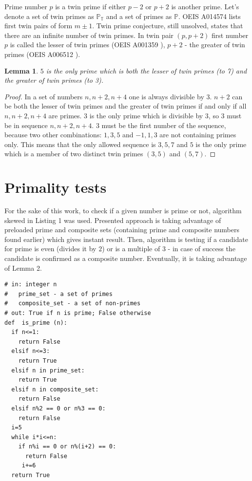 \documentclass[10pt,twocolumn]{article}
\newtheorem{lemma}[theorem]{Lemma}
\begin{document}
Prime number $p$ is a twin prime if either $p-2$ or $p+2$ is another prime. Let's denote a set of twin primes as $\mathbb{P_T}$ and a set of primes as $\mathbb{P}$. OEIS A014574 \cite{A014574} lists first twin pairs of form $m \pm 1$. Twin prime conjecture, still unsolved, states that there are an infinite number of twin primes. In twin pair $(p, p+2)$ first number $p$ is called the lesser of twin primes (OEIS A001359 \cite{A001359}), $p+2$ - the greater of twin primes (OEIS A006512 \cite{A006512}). 

\begin{lemma}
$5$ is the only prime which is both the lesser of twin primes (to 7) and the greater of twin primes (to 3).
\end{lemma}
\begin{proof}
In a set of numbers $n, n+2, n+4$ one is always divisible by $3$. $n+2$ can be both the lesser of twin primes and the greater of twin primes if and only if all $n, n+2, n+4$ are primes. $3$ is the only prime which is divisible by $3$, so $3$ must be in sequence $n, n+2, n+4$. $3$ must be the first number of the sequence, because two other combinations: $1, 3, 5$ and $-1, 1, 3$ are not containing primes only. This means that the only allowed sequence is $3, 5, 7$ and $5$ is the only prime which is a member of two distinct twin primes $(3, 5)$ and $(5, 7)$. 
\end{proof}

\section{Primality tests}

For the sake of this work, to check if a given number is prime or not, algorithm skewed in Listing 1 was used. Presented approach is taking advantage of preloaded prime and composite sets (containing prime and composite numbers found earlier) which gives instant result. Then, algorithm is testing if a candidate for prime is even (divides it by $2$) or is a multiple of $3$ - in case of success the candidate is confirmed as a composite number. Eventually, it is taking advantage of Lemma 2.

\lstset{language=Python}
\lstset{breaklines=true}
\lstset{frame=shadowbox}
\begin{lstlisting}[linewidth=8.7cm]
# in: integer n
#   prime_set - a set of primes
#   composite_set - a set of non-primes
# out: True if n is prime; False otherwise
def  is_prime (n):
  if n<=1:
    return False
  elsif n<=3:
    return True
  elsif n in prime_set:
    return True
  elsif n in composite_set:
    return False
  elsif n%2 == 0 or n%3 == 0:
    return False
  i=5
  while i*i<=n:
    if n%i == 0 or n%(i+2) == 0:
      return False
     i+=6
  return True
\end{lstlisting}
\end{document}
